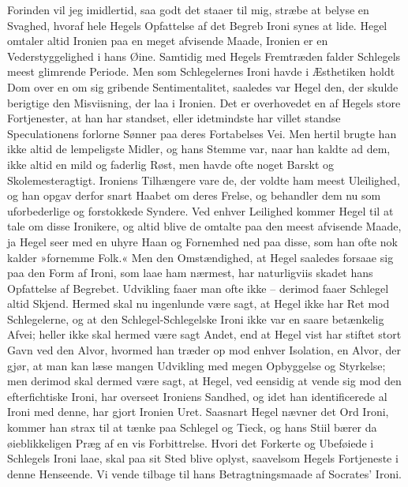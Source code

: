 \documentclass[12pt,a4paper]{article}
\begin{document}
Forinden vil jeg imidlertid, saa godt det staaer til mig, stræbe at belyse en Svaghed, hvoraf hele Hegels Opfattelse af det Begreb Ironi synes at lide. Hegel omtaler altid Ironien paa en meget afvisende Maade, Ironien er en Vederstyggelighed i hans Øine. Samtidig med Hegels Fremtræden falder Schlegels meest glimrende Periode. Men som Schlegelernes Ironi havde i Æsthetiken holdt Dom over en om sig gribende Sentimentalitet, saaledes var Hegel den, der skulde berigtige den Misviisning, der laa i Ironien. Det er overhovedet en af Hegels store Fortjenester, at han har standset, eller idetmindste har villet standse Speculationens forlorne Sønner paa deres Fortabelses Vei. Men hertil brugte han ikke altid de lempeligste Midler, og hans Stemme var, naar han kaldte ad dem, ikke altid en mild og faderlig Røst, men havde ofte noget Barskt og Skolemesteragtigt. Ironiens Tilhængere vare de, der voldte ham meest Uleilighed, og han opgav derfor snart Haabet om deres Frelse, og behandler dem nu som uforbederlige og forstokkede Syndere. Ved enhver Leilighed kommer Hegel til at tale om disse Ironikere, og altid blive de omtalte paa den meest afvisende Maade, ja Hegel seer med en uhyre Haan og Fornemhed ned paa disse, som han ofte nok kalder »fornemme Folk.« Men den Omstændighed, at Hegel saaledes forsaae sig paa den Form af Ironi, som laae ham nærmest, har naturligviis skadet hans Opfattelse af Begrebet. Udvikling faaer man ofte ikke – derimod faaer Schlegel altid Skjend. Hermed skal nu ingenlunde være sagt, at Hegel ikke har Ret mod Schlegelerne, og at den Schlegel-Schlegelske Ironi ikke var en saare betænkelig Afvei; heller ikke skal hermed være sagt Andet, end at Hegel vist har stiftet stort Gavn ved den Alvor, hvormed han træder op mod enhver Isolation, en Alvor, der gjør, at man kan læse mangen Udvikling med megen Opbyggelse og Styrkelse; men derimod skal dermed være sagt, at Hegel, ved eensidig at vende sig mod den efterfichtiske Ironi, har overseet Ironiens Sandhed, og idet han identificerede al Ironi med denne, har gjort Ironien Uret. Saasnart Hegel nævner det Ord Ironi, kommer han strax til at tænke paa Schlegel og Tieck, og hans Stiil bærer da øieblikkeligen Præg af en vis Forbittrelse. Hvori det Forkerte og Ubeføiede i Schlegels Ironi laae, skal paa sit Sted blive oplyst, saavelsom Hegels Fortjeneste i denne Henseende. Vi vende tilbage til hans Betragtningsmaade af Socrates' Ironi.
\end{document}
